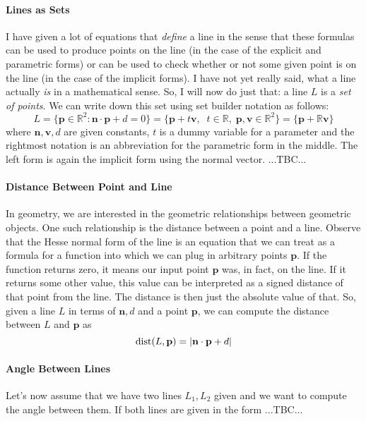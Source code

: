 \paragraph{Lines as Sets}
I have given a lot of equations that \emph{define} a line in the sense that these formulas can be used to produce points on the line (in the case of the explicit and parametric forms) or can be used to check whether or not some given point is on the line (in the case of the implicit forms). I have not yet really said, what a line actually \emph{is} in a mathematical sense. So, I will now do just that: a line $L$ is a \emph{set of points}. We can write down this set using set builder notation as follows: 
\begin{equation}
L = \{ \mathbf{p} \in \mathbb{R}^2 : \mathbf{n} \cdot \mathbf{p} + d = 0 \}
  = \{ \mathbf{p} + t \mathbf{v}, \;\; t \in \mathbb{R}, \; \mathbf{p,v} \in \mathbb{R}^2   \}
  = \{\mathbf{p} + \mathbb{R} \mathbf{v} \} 
\end{equation}
where $\mathbf{n}, \mathbf{v}, d$ are given constants, $t$ is a dummy variable for a parameter and the rightmost notation is an abbreviation for the parametric form in the middle. The left form is again the implicit form using the normal vector.
...TBC...

\paragraph{Distance Between Point and Line}
In geometry, we are interested in the geometric relationships between geometric objects. One such relationship is the distance between a point and a line. Observe that the Hesse normal form of the line is an equation that we can treat as a formula for a function into which we can plug in arbitrary points $\mathbf{p}$. If the function returns zero, it means our input point $\mathbf{p}$ was, in fact, on the line. If it returns some other value, this value can be interpreted as a signed distance of that point from the line. The distance is then just the absolute value of that. So, given a line $L$ in terms of $\mathbf{n}, d$ and a point $\mathbf{p}$, we can compute the distance between $L$ and $\mathbf{p}$ as
\begin{equation}
\operatorname{dist}(L, \mathbf{p}) = | \mathbf{n} \cdot \mathbf{p} + d |
\end{equation}


\paragraph{Angle Between Lines}
Let's now assume that we have two lines $L_1, L_2$ given and we want to compute the angle between them. If both lines are given in the form ...TBC...



